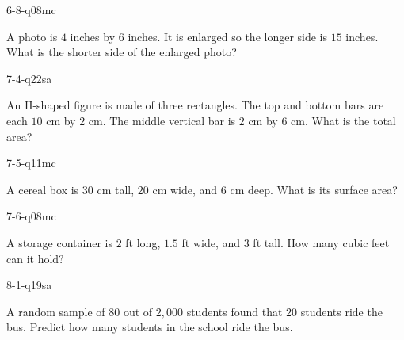 \begin{practiceQuestion}{6-8-q08}{mc}
\begin{questionText}
A photo is $4$ inches by $6$ inches. It is enlarged so the longer side is $15$ inches. What is the shorter side of the enlarged photo?
\end{questionText}
\end{practiceQuestion}

\begin{practiceQuestion}{7-4-q22}{sa}
\begin{questionText}
An H-shaped figure is made of three rectangles. The top and bottom bars are each $10$ cm by $2$ cm. The middle vertical bar is $2$ cm by $6$ cm. What is the total area?
\end{questionText}
\end{practiceQuestion}

\begin{practiceQuestion}{7-5-q11}{mc}
\begin{questionText}
A cereal box is $30$ cm tall, $20$ cm wide, and $6$ cm deep. What is its surface area?
\end{questionText}
\end{practiceQuestion}

\begin{practiceQuestion}{7-6-q08}{mc}
\begin{questionText}
A storage container is $2$ ft long, $1.5$ ft wide, and $3$ ft tall. How many cubic feet can it hold?
\end{questionText}
\end{practiceQuestion}

\begin{practiceQuestion}{8-1-q19}{sa}
\begin{questionText}
A random sample of $80$ out of $2{,}000$ students found that $20$ students ride the bus. Predict how many students in the school ride the bus.
\end{questionText}
\end{practiceQuestion}

